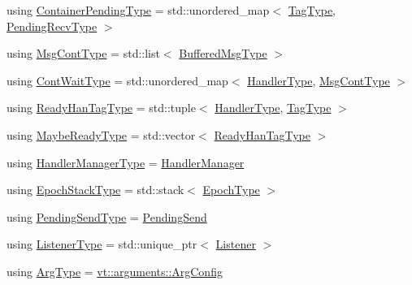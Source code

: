 \begin{DoxyCompactItemize}
using \hyperlink{structvt_1_1messaging_1_1_active_messenger_a388e97eeb72592e57551e045b43bcfde}{Container\+Pending\+Type} = std\+::unordered\+\_\+map$<$ \hyperlink{namespacevt_a84ab281dae04a52a4b243d6bf62d0e52}{Tag\+Type}, \hyperlink{structvt_1_1messaging_1_1_active_messenger_add1d7ab7bf168d53dfe7b93f29f64f02}{Pending\+Recv\+Type} $>$
\item 
using \hyperlink{structvt_1_1messaging_1_1_active_messenger_a18bbfbf9ecd82b33f6fc475b2e5290a5}{Msg\+Cont\+Type} = std\+::list$<$ \hyperlink{structvt_1_1messaging_1_1_active_messenger_a80a9cbda399d7bf035bfcecc761f4b02}{Buffered\+Msg\+Type} $>$
\item 
using \hyperlink{structvt_1_1messaging_1_1_active_messenger_a1c52f4ec0c93821191cb3e69dc7c8604}{Cont\+Wait\+Type} = std\+::unordered\+\_\+map$<$ \hyperlink{namespacevt_af64846b57dfcaf104da3ef6967917573}{Handler\+Type}, \hyperlink{structvt_1_1messaging_1_1_active_messenger_a18bbfbf9ecd82b33f6fc475b2e5290a5}{Msg\+Cont\+Type} $>$
\item 
using \hyperlink{structvt_1_1messaging_1_1_active_messenger_a98bb74aa4a561161dd7c7073dcd5f1d3}{Ready\+Han\+Tag\+Type} = std\+::tuple$<$ \hyperlink{namespacevt_af64846b57dfcaf104da3ef6967917573}{Handler\+Type}, \hyperlink{namespacevt_a84ab281dae04a52a4b243d6bf62d0e52}{Tag\+Type} $>$
\item 
using \hyperlink{structvt_1_1messaging_1_1_active_messenger_a745d5e8cad8c2f67d20479afacc6e134}{Maybe\+Ready\+Type} = std\+::vector$<$ \hyperlink{structvt_1_1messaging_1_1_active_messenger_a98bb74aa4a561161dd7c7073dcd5f1d3}{Ready\+Han\+Tag\+Type} $>$
\item 
using \hyperlink{structvt_1_1messaging_1_1_active_messenger_ac7e9165df6550ea333f8eb018a5a0e60}{Handler\+Manager\+Type} = \hyperlink{structvt_1_1_handler_manager}{Handler\+Manager}
\item 
using \hyperlink{structvt_1_1messaging_1_1_active_messenger_a746358029c37dabf2b4c8ad26642aee9}{Epoch\+Stack\+Type} = std\+::stack$<$ \hyperlink{namespacevt_a985a5adf291c34a3ca263b3378388236}{Epoch\+Type} $>$
\item 
using \hyperlink{structvt_1_1messaging_1_1_active_messenger_a3626a6ca76d8ad4ec7c3b47a2c70d3a8}{Pending\+Send\+Type} = \hyperlink{structvt_1_1messaging_1_1_pending_send}{Pending\+Send}
\item 
using \hyperlink{structvt_1_1messaging_1_1_active_messenger_a63878fd4ef1fbc505bd1313d32049ca9}{Listener\+Type} = std\+::unique\+\_\+ptr$<$ \hyperlink{structvt_1_1messaging_1_1_listener}{Listener} $>$
\item 
using \hyperlink{structvt_1_1messaging_1_1_active_messenger_a62cdeb842610617f316e6b20c19c5031}{Arg\+Type} = \hyperlink{structvt_1_1arguments_1_1_arg_config}{vt\+::arguments\+::\+Arg\+Config}
\end{DoxyCompactItemize}
